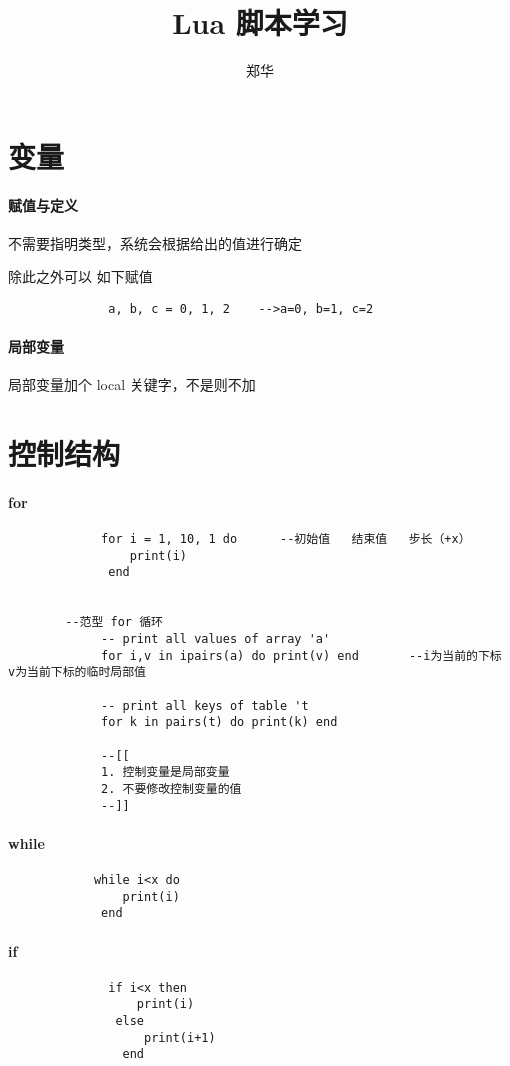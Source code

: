 \documentclass[UTF8,a4paper,8pt]{ctexart}
\author{郑华}
\title{Lua 脚本学习}
\begin{document}
 
 	\maketitle

\newpage
\section{变量}
	\paragraph{赋值与定义}
		不需要指明类型，系统会根据给出的值进行确定
		
		除此之外可以 如下赋值
		 \begin{lstlisting}
			  a, b, c = 0, 1, 2    -->a=0, b=1, c=2
		 \end{lstlisting}
		 
	\paragraph{局部变量}
		局部变量加个 local 关键字，不是则不加
\newpage  

\section{控制结构}
	\paragraph{for}
		 \begin{lstlisting}
			 for i = 1, 10, 1 do      --初始值   结束值   步长（+x）
				 print(i)
			  end
			  
			  
		--范型 for 循环	  
			 -- print all values of array 'a'
			 for i,v in ipairs(a) do print(v) end       --i为当前的下标   v为当前下标的临时局部值
			 
			 -- print all keys of table 't
			 for k in pairs(t) do print(k) end
			 
			 --[[
			 1. 控制变量是局部变量
			 2. 不要修改控制变量的值
			 --]]
		 \end{lstlisting}

	\paragraph{while}
		 \begin{lstlisting}
			while i<x do
				print(i)
			 end
		 \end{lstlisting}
	 
	 \paragraph{if}
		  \begin{lstlisting}
			  if i<x then
				  print(i)
			   else
				   print(i+1)
				end
		  \end{lstlisting}
\end{document}
